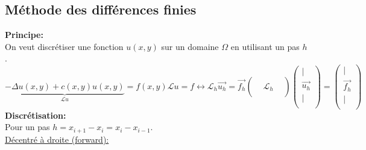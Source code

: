 \subsection*{Méthode des différences finies}
\textbf{Principe:}\\
On veut discrétiser une fonction $u(x,y)$ sur un domaine $\Omega$ en utilisant un pas $h$.
\begin{subequations}
    \begin{equation*}
        \underbrace{-\Delta u(x,y)+c(x,y)u(x,y)}_{\mathcal{L}u}=f(x,y)
    \end{equation*}
    \begin{equation*}
        \mathcal{L}u=f\leftrightarrow \mathcal{L}_h\overrightarrow{u_h}=\overrightarrow{f_h}
    \end{equation*}
    \begin{equation*}
        \begin{pmatrix}
             &               & \\
             & \mathcal{L}_h & \\
             &               &
        \end{pmatrix}
        \begin{pmatrix}
            |                    \\
            \overrightarrow{u_h} \\
            |                    \\
        \end{pmatrix}
        =
        \begin{pmatrix}
            |                    \\
            \overrightarrow{f_h} \\
            |                    \\
        \end{pmatrix}
    \end{equation*}
\end{subequations}
\textbf{Discrétisation:}\\
Pour un pas $h=x_{i+1}-x_i=x_i-x_{i-1}$.\\
\underline{Décentré à droite (forward):}
